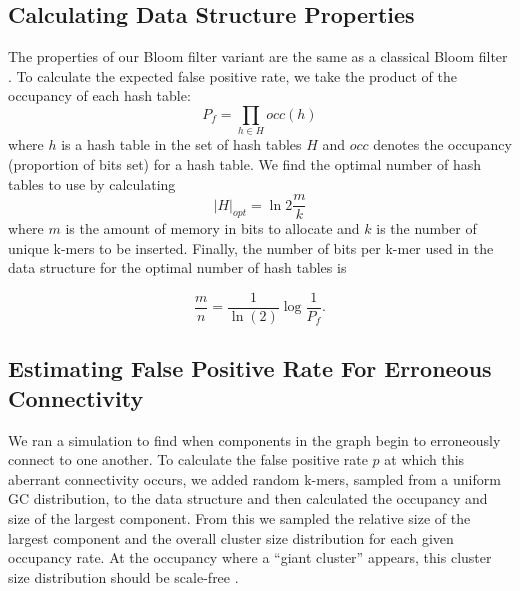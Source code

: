 \documentclass[12pt]{article} \usepackage{simplemargins}
\begin{document}
\subsection{Calculating Data Structure Properties}
The properties of our Bloom filter variant are the
same as a classical Bloom filter \cite{bloomsurvey}.
To calculate the expected false positive 
rate, we
take the product of the occupancy of each hash table:
\begin{displaymath}
P_f = \prod_{h \in H} occ(h)
\end{displaymath}
where $h$ is a hash table in the set of hash tables $H$ and $occ$ denotes
the occupancy (proportion of bits set) for a hash table.
We find the optimal number of hash tables
to use by calculating
\begin{displaymath}
\vert H \vert_{opt} = \ln 2 \frac{m}{k}
\end{displaymath}
where $m$ is the amount of memory in bits to allocate and $k$
is the number of unique k-mers to be inserted. Finally,
the number of bits per
k-mer used in the data structure for the optimal number of hash 
tables is

\begin{displaymath}
\frac{m}{n} = \frac{1}{\ln(2)} \log{\frac{1}{P_f}}.
\end{displaymath}

\begin{table}
\caption{The number of bits needed to store each k-mer for selected
false positive rates.  These numbers are independent of the specific k
chosen.}
\end{table}

\subsection{Estimating False Positive Rate For Erroneous Connectivity}
We ran a simulation to find when components in the graph 
begin to erroneously connect to one another.
To calculate the false positive rate $p$ at which this aberrant 
connectivity occurs, 
we added random k-mers, sampled from a uniform GC distribution, to the data structure 
and then calculated the occupancy and size of 
the largest 
component. From this we sampled the relative size of 
the largest component and the overall cluster size distribution for each
given occupancy rate.
At the occupancy where a ``giant cluster'' appears, this cluster size distribution 
should be scale-free \cite{stauffer1979scaling}. 
\end{document}
